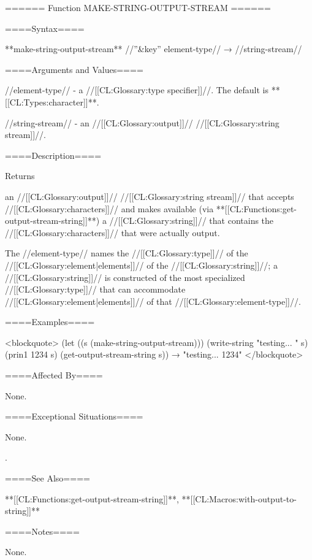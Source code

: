 ====== Function MAKE-STRING-OUTPUT-STREAM ======

====Syntax====

**make-string-output-stream** //''&key'' element-type// → //string-stream//

====Arguments and Values====

//element-type// - a //[[CL:Glossary:type specifier]]//. The default is **[[CL:Types:character]]**.

//string-stream// - an //[[CL:Glossary:output]]// //[[CL:Glossary:string stream]]//.

====Description====

Returns

an //[[CL:Glossary:output]]// //[[CL:Glossary:string stream]]// that accepts //[[CL:Glossary:characters]]// and makes available (via **[[CL:Functions:get-output-stream-string]]**) a //[[CL:Glossary:string]]// that contains the //[[CL:Glossary:characters]]// that were actually output.

The //element-type// names the //[[CL:Glossary:type]]// of the //[[CL:Glossary:element|elements]]// of the //[[CL:Glossary:string]]//; a //[[CL:Glossary:string]]// is constructed of the most specialized //[[CL:Glossary:type]]// that can accommodate //[[CL:Glossary:element|elements]]// of that //[[CL:Glossary:element-type]]//.

====Examples====

<blockquote> (let ((s (make-string-output-stream))) (write-string "testing... " s) (prin1 1234 s) (get-output-stream-string s)) → "testing... 1234" </blockquote>

====Affected By====

None.

====Exceptional Situations====

None.

\None.

====See Also====

**[[CL:Functions:get-output-stream-string]]**, **[[CL:Macros:with-output-to-string]]**

====Notes====

None.

  
